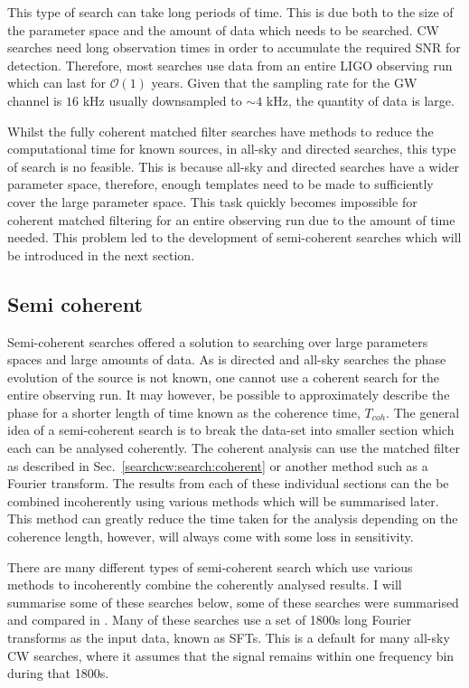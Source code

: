 This type of search can take long periods of time. 
This is due both to the size of the parameter space and the amount of data which needs to be searched.
\gls{CW} searches need long observation times in order to accumulate the required \gls{SNR} for detection.
Therefore, most searches use data from an entire \gls{LIGO} observing run which can last for $\mathcal{O}(1)$ years.
Given that the sampling rate for the \gls{GW} channel is $16$ kHz usually downsampled to $\sim 4$ kHz, the quantity of data is large. 


Whilst the fully coherent matched filter searches have methods to reduce the computational time for known sources, in all-sky and directed searches, this type of search is no feasible. 
This is because all-sky and directed searches have a wider parameter space, therefore, enough templates need to be made to sufficiently cover the large parameter space. 
This task quickly becomes impossible for coherent matched filtering for an entire observing run due to the amount of time needed. This problem led to the development of semi-coherent searches which will be introduced in the next section. 


\subsection{\label{searchcw:search:semi}Semi coherent}

Semi-coherent searches offered a solution to searching over large parameters spaces and large amounts of data. 
As is directed and all-sky searches the phase evolution of the source is not known, one cannot use a coherent search for the entire observing run.
It may however, be possible to approximately describe the phase for a shorter length of time known as the coherence time, $T_{coh}$.
The general idea of a semi-coherent search is to break the data-set into smaller section which each can be analysed coherently.
The coherent analysis can use the matched filter as described in Sec.~\ref{searchcw:search:coherent} or another method such as a Fourier transform.
The results from each of these individual sections can the be combined incoherently using various methods which will be summarised later. 
This method can greatly reduce the time taken for the analysis depending on the coherence length, however, will always come with some loss in sensitivity. 

There are many different types of semi-coherent search which use various methods to incoherently combine the coherently analysed results. 
I will summarise some of these searches below, some of these searches were summarised and compared in \citep{walsh2016ComparisonMethods}.
Many of these searches use a set of 1800s long Fourier transforms as the input data, known as \glspl{SFT}. This is a default for many all-sky \gls{CW} searches, where it assumes that the signal remains within one frequency bin during that 1800s.

